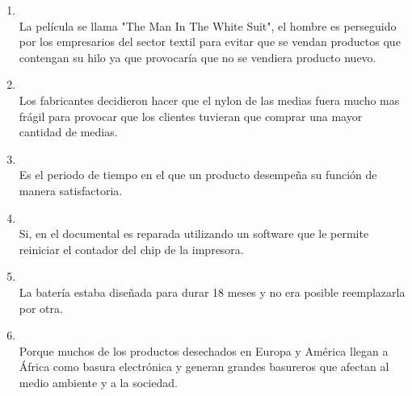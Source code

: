 \documentclass[spanish,openany]{report}
\begin{document}
\begin{enumerate}
            El problema real de la impresora es la existencia de un bloqueo automático de la impresión una vez se llega a un numero predeterminad
            de impresiones, problema de fácil solución si en vez de bloquear la impresión notificásemos al usuario de que la esponja que absorbe la tinta de la limpieza de cabezales esta sucia y necesita una limpieza permitiendo al usuario reiniciar el contador fácilmente. 
        \item{}\\
            La película se llama "The Man In The White Suit", el hombre es perseguido por los empresarios del sector textil para evitar
            que se vendan productos que contengan su hilo ya que provocaría que no se vendiera producto nuevo.
        \item{}\\
            Los fabricantes decidieron hacer que el nylon de las medias fuera mucho mas frágil para provocar que los clientes
            tuvieran que comprar una mayor cantidad de medias.
        \item{}\\
            Es el periodo de tiempo en el que un producto desempeña su función de manera satisfactoria.
        \item{}\\
            Si, en el documental es reparada utilizando un software que le permite reiniciar el contador del chip de la impresora.
        \item{}\\
            La batería estaba diseñada para durar 18 meses  y no era posible reemplazarla por otra. 
        \item{}\\
            Porque muchos de los productos desechados en Europa y América llegan a África como basura electrónica y generan 
            grandes basureros que afectan al medio ambiente y a la sociedad.
             

\end{enumerate}
\end{document}
